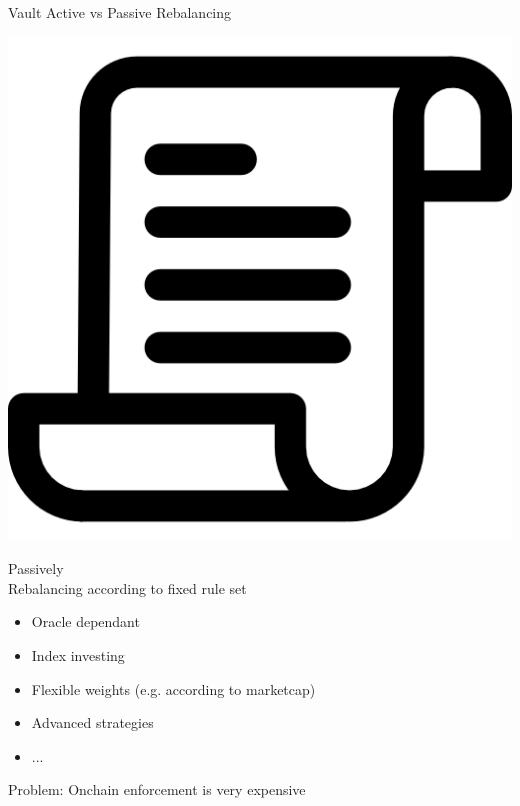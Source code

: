 \documentclass[handout]{beamer}
\begin{document}
\begin{frame}{Vault Active vs Passive Rebalancing}
\begin{minipage}{0.4\textwidth}
		\begin{center}
			\includegraphics[scale=0.107]{../assets/images/document.png}
		\end{center}
		\begin{center}
		Passively 	\\ \vspace{1em}
		Rebalancing according to fixed rule set \vspace{0.5em}		
			\begin{scriptsize}
				\begin{itemize}
					\item<1-> Oracle dependant
					\item<2-> Index investing
					\item<3-> Flexible weights (e.g. according to marketcap)
					\item<4->  Advanced strategies
					\item<4->  ...
				\end{itemize}
			\end{scriptsize}
		\end{center}
	\end{minipage}
	
\vspace{1.5em}\center
Problem: Onchain enforcement is very expensive
\end{frame}
\end{document}
